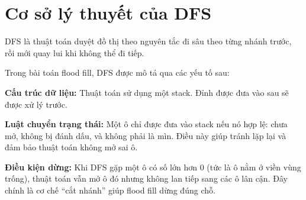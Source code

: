 \section{Cơ sở lý thuyết của DFS}

DFS là thuật toán duyệt đồ thị theo nguyên tắc đi sâu theo từng nhánh trước, rồi mới quay lui khi không thể đi tiếp.

Trong bài toán flood fill, DFS được mô tả qua các yếu tố sau:

\textbf{Cấu trúc dữ liệu:}  
Thuật toán sử dụng một stack. Đỉnh được đưa vào sau sẽ được xử lý trước.

\textbf{Luật chuyển trạng thái:}  
Một ô chỉ được đưa vào stack nếu nó hợp lệ: chưa mở, không bị đánh dấu, và không phải là mìn. Điều này giúp tránh lặp lại và đảm bảo thuật toán không mở sai ô.

\textbf{Điều kiện dừng:}  
Khi DFS gặp một ô có số lớn hơn 0 (tức là ô nằm ở viền vùng trống), thuật toán vẫn mở ô đó nhưng không lan tiếp sang các ô lân cận. Đây chính là cơ chế “cắt nhánh” giúp flood fill dừng đúng chỗ.
